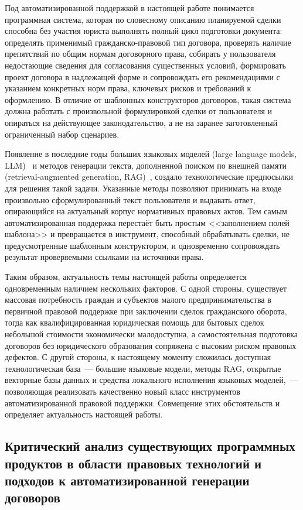 Под автоматизированной поддержкой в настоящей работе понимается программная система, которая по словесному описанию планируемой сделки способна без участия юриста выполнять полный цикл подготовки документа: определять применимый гражданско-правовой тип договора, проверять наличие препятствий по общим нормам договорного права, собирать у пользователя недостающие сведения для согласования существенных условий, формировать проект договора в надлежащей форме и сопровождать его рекомендациями с указанием конкретных норм права, ключевых рисков и требований к оформлению. В отличие от шаблонных конструкторов договоров, такая система должна работать с произвольной формулировкой сделки от пользователя и опираться на действующее законодательство, а не на заранее заготовленный ограниченный набор сценариев.

Появление в последние годы больших языковых моделей (large language models, LLM)~\cite{jurafsky_martin_2024} и методов генерации текста, дополненной поиском по внешней памяти (retrieval-augmented generation, RAG)~\cite{lewis2020rag}, создало технологические предпосылки для решения такой задачи. Указанные методы позволяют принимать на входе произвольно сформулированный текст пользователя и выдавать ответ, опирающийся на актуальный корпус нормативных правовых актов. Тем самым автоматизированная поддержка перестаёт быть простым <<заполнением полей шаблона>> и превращается в инструмент, способный обрабатывать сделки, не предусмотренные шаблонным конструктором, и одновременно сопровождать результат проверяемыми ссылками на источники права.

Таким образом, актуальность темы настоящей работы определяется одновременным наличием нескольких факторов. С одной стороны, существует массовая потребность граждан и субъектов малого предпринимательства в первичной правовой поддержке при заключении сделок гражданского оборота, тогда как квалифицированная юридическая помощь для бытовых сделок небольшой стоимости экономически малодоступна, а самостоятельная подготовка договоров без юридического образования сопряжена с высоким риском правовых дефектов. С другой стороны, к настоящему моменту сложилась доступная технологическая база~--- большие языковые модели, методы RAG, открытые векторные базы данных и средства локального исполнения языковых моделей,~--- позволяющая реализовать качественно новый класс инструментов автоматизированной правовой поддержки. Совмещение этих обстоятельств и определяет актуальность настоящей работы.

\subsection{Критический анализ существующих программных продуктов в области правовых технологий и подходов к автоматизированной генерации договоров}

